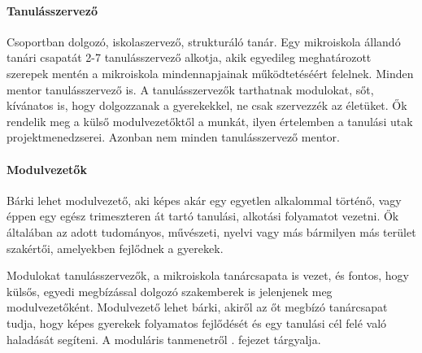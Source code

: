   \paragraph{Tanulásszervező}
  Csoportban dolgozó, iskolaszervező, strukturáló tanár. Egy mikroiskola állandó tanári
  csapatát 2-7 tanulásszervező alkotja, akik egyedileg meghatározott szerepek mentén a mikroiskola mindennapjainak működtetéséért felelnek. Minden mentor tanulásszervező is. A tanulásszervezők tarthatnak
  modulokat, sőt, kívánatos is, hogy dolgozzanak a gyerekekkel, ne csak szervezzék az életüket.
  Ők rendelik meg a külső modulvezetőktől a munkát, ilyen értelemben a
  tanulási utak projektmenedzserei. Azonban nem minden tanulásszervező mentor.

  \paragraph{Modulvezetők}

  Bárki lehet modulvezető, aki képes akár egy egyetlen alkalommal történő, vagy éppen
  egy egész trimeszteren át tartó tanulási, alkotási folyamatot vezetni. Ők általában
  az adott tudományos, művészeti, nyelvi vagy más bármilyen más terület szakértői, amelyekben fejlődnek a gyerekek.

  Modulokat tanulásszervezők, a mikroiskola tanárcsapata is vezet, és fontos, hogy külsős, egyedi megbízással dolgozó szakemberek is jelenjenek meg modulvezetőként. Modulvezető lehet bárki, akiről az őt megbízó tanárcsapat tudja, hogy képes gyerekek folyamatos fejlődését és egy tanulási cél felé való haladását segíteni. A moduláris tanmenetről . fejezet tárgyalja.
